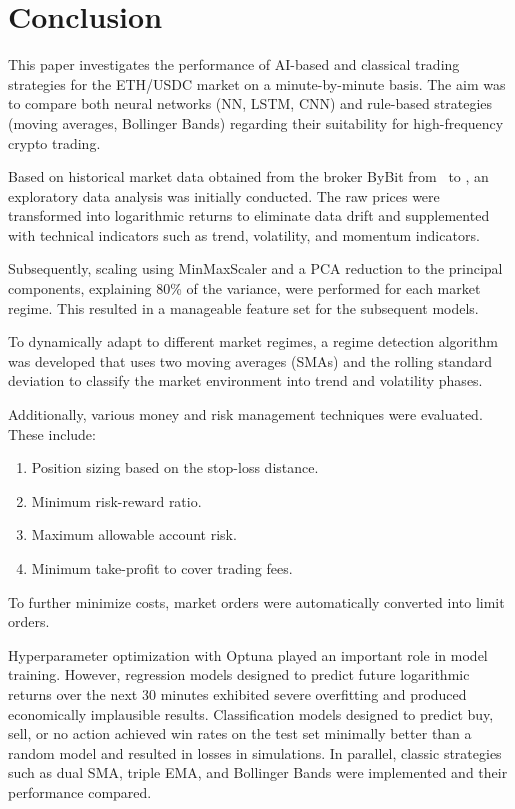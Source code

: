 \section{Conclusion}
\label{chap:conclusion}

This paper investigates the performance of AI-based and classical trading strategies for the ETH/USDC market on a minute-by-minute basis.
The aim was to compare both neural networks (NN, LSTM, CNN) and rule-based strategies (moving averages, Bollinger Bands) regarding their suitability for high-frequency crypto trading.

Based on historical market data obtained from the broker ByBit from \ethDataStartDate~to \ethDataEndDate, an exploratory data analysis was initially conducted.
The raw prices were transformed into logarithmic returns to eliminate data drift and supplemented with technical indicators such as trend, volatility, and momentum indicators.

Subsequently, scaling using MinMaxScaler and a PCA reduction to the principal components, explaining 80\% of the variance, were performed for each market regime.
This resulted in a manageable feature set for the subsequent models.

To dynamically adapt to different market regimes, a regime detection algorithm was developed that uses two moving averages (SMAs) and the rolling standard deviation to classify the market environment into trend and volatility phases.

Additionally, various money and risk management techniques were evaluated.
These include:

\begin{enumerate}
    \item Position sizing based on the stop-loss distance.
    \item Minimum risk-reward ratio.
    \item Maximum allowable account risk.
    \item Minimum take-profit to cover trading fees.
\end{enumerate}

\noindent
To further minimize costs, market orders were automatically converted into limit orders.

Hyperparameter optimization with Optuna played an important role in model training.
However, regression models designed to predict future logarithmic returns over the next 30 minutes exhibited severe overfitting and produced economically implausible results.
Classification models designed to predict buy, sell, or no action achieved win rates on the test set minimally better than a random model and resulted in losses in simulations.
In parallel, classic strategies such as dual SMA, triple EMA, and Bollinger Bands were implemented and their performance compared.


